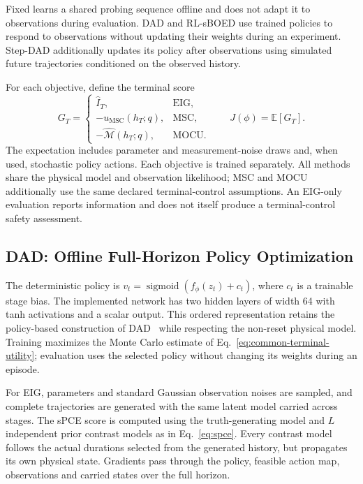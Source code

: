 \documentclass[journal]{IEEEtran}
\newcommand{\E}{\mathbb E}
\begin{document}
Fixed learns a shared probing sequence offline and does not adapt it to
observations during evaluation. DAD and RL-sBOED use trained policies to
respond to observations without updating their weights during an experiment.
Step-DAD additionally updates its policy after observations using simulated
future trajectories conditioned on the observed history.

For each objective, define the terminal score
\begin{equation}
G_T=\begin{cases}
\widehat I_T, & \text{EIG},\\
-u_{\mathrm{MSC}}(h_T;q), & \text{MSC},\\
-\widehat{\mathcal M}(h_T;q), & \text{MOCU}.
\end{cases}
\qquad J(\phi)=\E[G_T].
\label{eq:common-terminal-utility}
\end{equation}
The expectation includes parameter and measurement-noise draws and, when
used, stochastic policy actions. Each objective is trained separately.
All methods share the physical model and observation likelihood; MSC and
MOCU additionally use the same declared terminal-control assumptions.
An EIG-only evaluation reports information and does not itself produce a
terminal-control safety assessment.

\subsection{DAD: Offline Full-Horizon Policy Optimization}
The deterministic policy is
$v_t=\operatorname{sigmoid}(f_\phi(z_t)+c_t)$, where $c_t$ is a trainable
stage bias. The implemented network has two hidden layers of width 64 with
tanh activations and a scalar output. This ordered representation retains the
policy-based construction of DAD~\cite{foster2021dad} while respecting the
non-reset physical model. Training maximizes the Monte Carlo estimate of
Eq.~\eqref{eq:common-terminal-utility}; evaluation uses the selected policy
without changing its weights during an episode.

For EIG, parameters and standard Gaussian observation noises are sampled,
and complete trajectories are generated with the same latent model carried
across stages. The sPCE score is computed using the truth-generating model and
$L$ independent prior contrast models as in Eq.~\eqref{eq:spce}. Every contrast
model follows the actual durations selected from the generated history, but
propagates its own physical state. Gradients pass through the policy, feasible
action map, observations and carried states over the full horizon.
\end{document}
